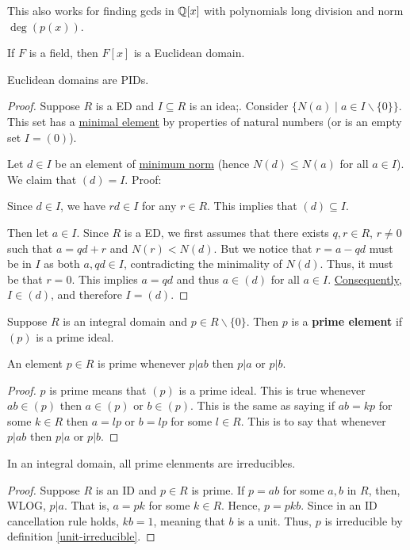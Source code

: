 \documentclass[12pt]{article}
\begin{document}
This also works for finding gcds in $\mathbb{Q}[x]$ with polynomials long division and norm $\deg (p(x))$.

\rmk If $F$ is a field, then $F[x]$ is a Euclidean domain.

\rmk Euclidean domains are PIDs.
\begin{proof}
    Suppose $R$ is a ED and $I\subseteq R$ is an idea;. Consider $\{N(a)\mid a\in I\backslash \{0\}\}$. This set has a \underline{minimal element} by properties of natural numbers (or is an empty set \ifnif $I=(0)$).

    Let $d\in I$ be an element of \underline{minimum norm} (hence $N(d)\leq N(a)$ for all $a\in I$). We claim that \underline{$(d)=I$}. Proof:

    Since $d\in I$, we have $rd\in I$ for any $r\in R$. This implies that $(d)\subseteq I$.

    Then let $a\in I$. Since $R$ is a ED, we first assumes that there exists $q,r\in R$, $r\neq 0$ such that $a=qd+r$ and $N(r)<N(d)$. But we notice that $r=a-qd$ must be in $I$ as both $a, qd\in I$, contradicting the minimality of $N(d)$. Thus, it must be that $r=0$. This implies $a=qd$ and thus $a\in (d)$ for all $a\in I$. \underline{Consequently, $I\in (d)$}, and therefore $I=(d)$.
\end{proof}

 Suppose $R$ is an integral domain and $p\in R\backslash \{0\}$. Then $p$ is a \textbf{prime element} if $(p)$ is a prime ideal.

\begin{proposition}
    An element $p\in R$ is prime \ifnif whenever $p|ab$ then $p|a$ or $p|b$.
\end{proposition}
\begin{proof}
    $p$ is prime means that $(p)$ is a prime ideal. This is true \ifnif whenever $ab\in (p)$ then $a\in (p)$ or $b\in (p)$. This is the same as saying if $ab=kp$ for some $k\in R$ then $a=lp$ or $b=lp$ for some $l\in R$. This is to say that whenever $p|ab$ then $p|a$ or $p|b$.
\end{proof}

\begin{proposition}
    In an integral domain, all prime elenments are irreducibles.
\end{proposition}
\begin{proof}
    Suppose $R$ is an ID and $p\in R$ is prime. If $p=ab$ for some $a,b$ in $R$, then, WLOG, $p|a$. That is, $a=pk$ for some $k\in R$. Hence, $p=pkb$. Since in an ID cancellation rule holds, $kb=1$, meaning that $b$ is a unit. Thus, $p$ is irreducible by definition \cref{unit-irreducible}.
\end{proof}
\end{document}
